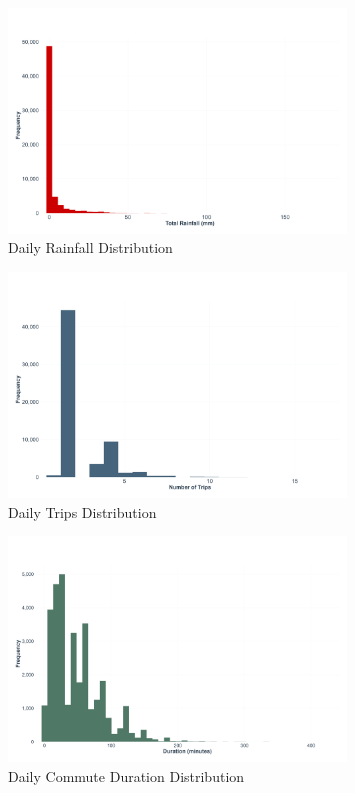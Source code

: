 
\begin{figure}[H]
    \centering
    \includegraphics[width=0.8\textwidth]{../figures/rainfall_histogram.png}
    \caption{Daily Rainfall Distribution}
    \label{fig:rainfall_hist}
\end{figure}

\begin{figure}[H]
    \centering
    \includegraphics[width=0.8\textwidth]{../figures/trips_histogram.png}
    \caption{Daily Trips Distribution}
    \label{fig:trips_hist}
\end{figure}

\begin{figure}[H]
    \centering
    \includegraphics[width=0.8\textwidth]{../figures/duration_histogram.png}
    \caption{Daily Commute Duration Distribution}
    \label{fig:duration_hist}
\end{figure}

